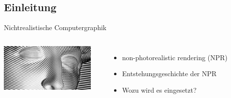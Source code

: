 \subsection{Einleitung}
\begin{frame}{Nichtrealistische Computergraphik}
  \begin{columns}
	\includegraphics[width=0.9\textwidth]{../images/npr_schraffur.jpg}
	  \begin{itemize}
	    \item non-photorealistic rendering (NPR)
%
		\item  Entstehungsgeschichte der NPR

	    \item Wozu wird es eingesetzt?
      \end{itemize}
   \end{columns}
\end{frame}

